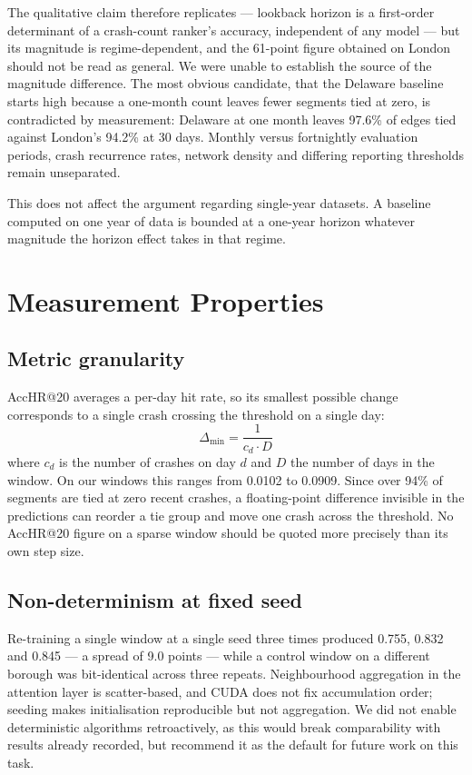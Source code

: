 \documentclass[conference]{IEEEtran}
\begin{document}
The qualitative claim therefore replicates --- lookback horizon is a
first-order determinant of a crash-count ranker's accuracy, independent of
any model --- but its magnitude is regime-dependent, and the 61-point
figure obtained on London should not be read as general. We were unable to
establish the source of the magnitude difference. The most obvious
candidate, that the Delaware baseline starts high because a one-month
count leaves fewer segments tied at zero, is contradicted by measurement:
Delaware at one month leaves 97.6\% of edges tied against London's 94.2\%
at 30 days. Monthly versus fortnightly evaluation periods, crash
recurrence rates, network density and differing reporting thresholds
remain unseparated.

This does not affect the argument regarding single-year datasets. A
baseline computed on one year of data is bounded at a one-year horizon
whatever magnitude the horizon effect takes in that regime.

\section{Measurement Properties}
\label{sec:measure}

\subsection{Metric granularity}

AccHR@20 averages a per-day hit rate, so its smallest possible change
corresponds to a single crash crossing the threshold on a single day:
\begin{equation}
\Delta_{\min} = \frac{1}{c_d \cdot D}
\end{equation}
where $c_d$ is the number of crashes on day $d$ and $D$ the number of days
in the window. On our windows this ranges from 0.0102 to 0.0909. Since
over 94\% of segments are tied at zero recent crashes, a floating-point
difference invisible in the predictions can reorder a tie group and move
one crash across the threshold. No AccHR@20 figure on a sparse window
should be quoted more precisely than its own step size.

\subsection{Non-determinism at fixed seed}

Re-training a single window at a single seed three times produced 0.755,
0.832 and 0.845 --- a spread of 9.0 points --- while a control window on a
different borough was bit-identical across three repeats. Neighbourhood
aggregation in the attention layer is scatter-based, and CUDA does not fix
accumulation order; seeding makes initialisation reproducible but not
aggregation. We did not enable deterministic algorithms retroactively, as
this would break comparability with results already recorded, but
recommend it as the default for future work on this task.
\end{document}
